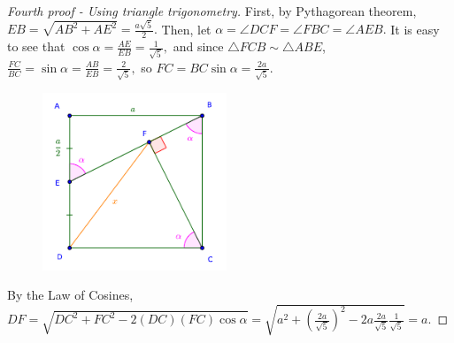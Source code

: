 \documentclass{article}
\begin{document}
\begin{proof}[Fourth proof - Using triangle trigonometry]
    First, by Pythagorean theorem, $EB = \sqrt{AB^2 +AE^2} = \frac{a\sqrt{5}}{2}.$
    Then, let $\alpha = \angle DCF = \angle FBC = \angle AEB.$
    It is easy to see that $\cos{\alpha} = \frac{AE}{EB} = \frac{1}{\sqrt{5}},$
    and since $\triangle FCB \sim \triangle ABE$, $\frac{FC}{BC} = \sin{\alpha} = \frac{AB}{EB} = \frac{2}{\sqrt{5}},$
    so $FC = BC \sin{\alpha} = \frac{2a}{\sqrt{5}}.$

    \begin{figure}[h]
        \centering
        \begin{minipage}[t]{8cm}
            \centering
            \includegraphics[width=5.5cm]{./svg/pdf/2022-2-ms-1-1-h.pdf}
        \end{minipage}
    \end{figure}

    By the Law of Cosines,
    $DF = \sqrt{DC^2 +  FC^2 - 2(DC)(FC)\cos{\alpha}}
    = \sqrt{a^2 + \left(\frac{2a}{\sqrt{5}}\right)^2 - 2a \frac{2a}{\sqrt{5}} \frac{1}{\sqrt{5}}} = a.$
\end{proof}
\end{document}
